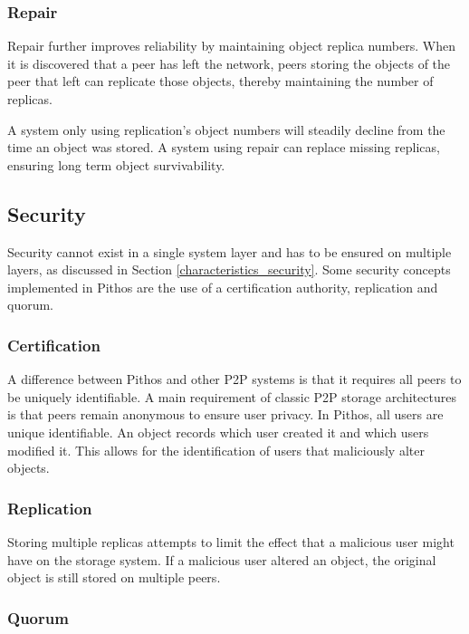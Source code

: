 \subsubsection{Repair}

Repair further improves reliability by maintaining object replica numbers. When it is discovered that a peer has left the network, peers storing the objects of the peer that left can replicate those objects, thereby maintaining the number of replicas.

A system only using replication's object numbers will steadily decline from the time an object was stored. A system using repair can replace missing replicas, ensuring long term object survivability.

\subsection{Security}

Security cannot exist in a single system layer and has to be ensured on multiple layers, as discussed in Section \ref{characteristics_security}. Some security concepts implemented in Pithos are the use of a certification authority, replication and quorum.

\subsubsection{Certification}

A difference between Pithos and other P2P systems is that it requires all peers to be uniquely identifiable. A main requirement of classic P2P storage architectures is that peers remain anonymous to ensure user privacy. In Pithos, all users are unique identifiable. An object records which user created it and which users modified it. This allows for the identification of users that maliciously alter objects.

\subsubsection{Replication}

Storing multiple replicas attempts to limit the effect that a malicious user might have on the storage system. If a malicious user altered an object, the original object is still stored on multiple peers.

\subsubsection{Quorum}

